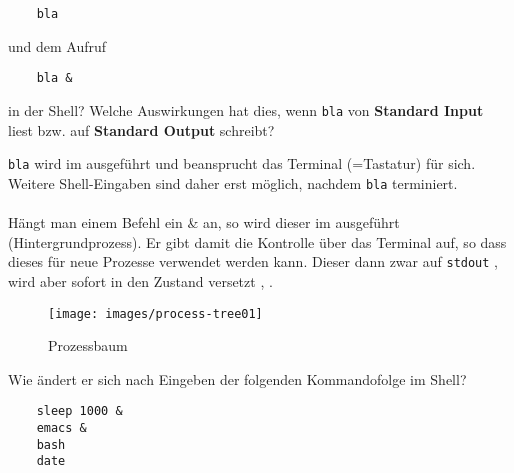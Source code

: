 \begin{multilinequestion}

  \begin{lstlisting}
    bla
  \end{lstlisting}

  und dem Aufruf

  \begin{lstlisting}
    bla &
  \end{lstlisting}

  in der Shell? Welche Auswirkungen hat dies, wenn \texttt{bla} von \textbf{Standard Input} liest bzw. auf \textbf{Standard Output} schreibt?
\end{multilinequestion}

\begin{answer}
  \texttt{bla} wird im  ausgeführt und beansprucht das Terminal (=Tastatur) für sich. Weitere Shell-Eingaben sind daher erst möglich, nachdem \texttt{bla} terminiert.

  \paragraph{}
  Hängt man einem Befehl ein \& an, so wird dieser im  ausgeführt (Hintergrundprozess). Er gibt damit die Kontrolle über das Terminal auf, so dass dieses für neue Prozesse verwendet werden kann. Dieser  dann zwar auf \texttt{stdout} , wird aber sofort in den Zustand  versetzt , .
\end{answer}

\begin{multilinequestion}

  \begin{figure}[H]
    \caption{Prozessbaum}
    \centering
    \texttt{[image: images/process-tree01]}
  \end{figure}

  Wie ändert er sich nach Eingeben der folgenden Kommandofolge im Shell?

  \begin{lstlisting}
    sleep 1000 &
    emacs &
    bash
    date
  \end{lstlisting}

\end{multilinequestion}


